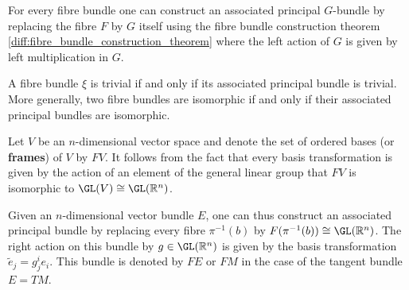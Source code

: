     \begin{construct}\label{diff:associated_bundle_construction}
        For every fibre bundle one can construct an associated principal $G$-bundle by replacing the fibre $F$ by $G$ itself using the fibre bundle construction theorem \ref{diff:fibre_bundle_construction_theorem} where the left action of $G$ is given by left multiplication in $G$.
    \end{construct}

    \begin{property}
        A fibre bundle $\xi$ is trivial if and only if its associated principal bundle is trivial. More generally, two fibre bundles are isomorphic if and only if their associated principal bundles are isomorphic.
    \end{property}

    \begin{example}\label{diff:frame_bundle}
        Let $V$ be an $n$-dimensional vector space and denote the set of ordered bases (or \textbf{frames}) of $V$ by $FV$. It follows from the fact that every basis transformation is given by the action of an element of the general linear group that $FV$ is isomorphic to $\GL(V)\cong\GL(\mathbb{R}^n)$.

        Given an $n$-dimensional vector bundle $E$, one can thus construct an associated principal bundle by replacing every fibre $\pi^{-1}(b)$ by $F(\pi^{-1}(b))\cong\GL(\mathbb{R}^n)$. The right action on this bundle by $g\in\GL(\mathbb{R}^n)$ is given by the basis transformation $\widetilde{e}_j = g^i_je_i$. This bundle is denoted by $FE$ or $FM$ in the case of the tangent bundle $E=TM$.
    \end{example}

